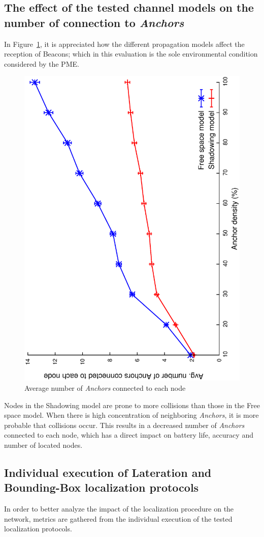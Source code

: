 \subsection{The effect of the tested channel models on the number of connection to \emph{Anchors}}\label{channel_considerations}
In Figure~\ref{fig:channelAndBeacons}, it is appreciated how the different propagation models affect the reception of Beacons; which in this evaluation is the sole environmental condition considered by the PME.

\begin{figure}[tb]
  \centering
  \includegraphics[width=0.7\linewidth, angle = -90]{section4/figures/avgBeaconPerNode.eps}
  \caption{Average number of \emph{Anchors} connected to each node}
  \label{fig:channelAndBeacons}
\end{figure}

Nodes in the Shadowing model are prone to more collisions than those in the Free space model. When there is high concentration of neighboring \emph{Anchors}, it is more probable that collisions occur. This results in a decreased number of \emph{Anchors} connected to each node, which has a direct impact on battery life, accuracy and number of located nodes.

\subsection{Individual execution of Lateration and Bounding-Box localization protocols}\label{individual_execution}
In order to better analyze the impact of the localization procedure on the network, metrics are gathered from the individual execution of the tested localization protocols.

